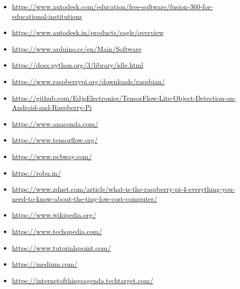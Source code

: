 \begin{itemize}
\small
\item \url{https://www.autodesk.com/education/free-software/fusion-360-for-educational-institutions}\label{fusion360}

\item \url{https://www.autodesk.in/products/eagle/overview}\label{eagle}

\item \url{https://www.arduino.cc/en/Main/Software}\label{arduinoide}

\item \url{https://docs.python.org/3/library/idle.html}\label{pythonidle}

\item \url{https://www.raspberrypi.org/downloads/raspbian/}\label{raspbian}

\item \url{https://github.com/EdjeElectronics/TensorFlow-Lite-Object-Detection-on-Android-and-Raspberry-Pi}\label{edjeelectronics}

\item \url{https://www.anaconda.com/}

\item \url{https://www.tensorflow.org/}\label{tensorflow}

\item \url{https://www.pcbway.com/}

\item \url{https://robu.in/}

\item \url{https://www.zdnet.com/article/what-is-the-raspberry-pi-4-everything-you-need-to-know-about-the-tiny-low-cost-computer/}

\item \url{https://www.wikipedia.org/}

\item \url{https://www.techopedia.com/}

\item \url{https://www.tutorialspoint.com/}

\item \url{https://medium.com/}

\item \url{https://internetofthingsagenda.techtarget.com/}

\end{itemize}